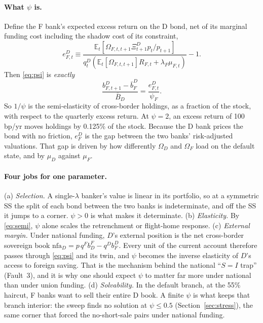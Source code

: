 \documentclass[11pt]{article}
\newcommand{\E}{\mathbb{E}}
\begin{document}
\paragraph{What $\psi$ is.} Define the F bank's expected excess return on the D bond, net of its
marginal funding cost including the shadow cost of its constraint,
\begin{equation}
e^D_{F,t}\equiv\frac{\E_t[\Omega_{F,t,t+1}\Xi^D_{t+1}p_t/p_{t+1}]}
{q^D_t(\E_t[\Omega_{F,t,t+1}]R_{F,t}+\lambda_F\mu_{F,t})}-1 .
\end{equation}
Then \eqref{eq:psi} is \emph{exactly}
\begin{equation}
\frac{b^D_{F,t+1}-\bar b^D_F}{\bar B_D}=\frac{e^D_{F,t}}{\psi_F}.
\label{eq:semi}
\end{equation}
So $1/\psi$ is the semi-elasticity of cross-border holdings, as a fraction of the stock, with
respect to the quarterly excess return. At $\psi=2$, an excess return of 100 bp/yr moves holdings
by 0.125\% of the stock. Because the D bank prices the bond with no friction, $e^D_F$ is the gap
between the two banks' risk-adjusted valuations. That gap is driven by how differently
$\Omega_D$ and $\Omega_F$ load on the default state, and by $\mu_D$ against $\mu_F$.

\paragraph{Four jobs for one parameter.} (a) \emph{Selection.} A single-$\lambda$ banker's
value is linear in its portfolio, so at a symmetric SS the split of each bond between the two
banks is indeterminate, and off the SS it jumps to a corner. $\psi>0$ is what makes it
determinate. (b) \emph{Elasticity.} By \eqref{eq:semi}, $\psi$ alone scales the retrenchment
or flight-home response. (c) \emph{External margin.} Under national funding, $D$'s external
position is the net cross-border sovereign book
$\mathrm{nfa}_D=p\,q^F b^F_D-q^D b^D_F$. Every unit of the current account therefore passes
through \eqref{eq:psi} and its twin, and $\psi$ becomes the inverse elasticity of $D$'s access to
foreign saving. That is the mechanism behind the national ``$S=I$ trap'' (Fault~3), and it is
why one should expect $\psi$ to matter far more under national than under union funding.
(d) \emph{Solvability.} In the default branch, at the 55\% haircut, F banks want to sell their
entire D book. A finite $\psi$ is what keeps that branch interior: the sweep finds no solution
at $\psi\le0.5$ (Section~\ref{sec:stress}), the same corner that forced the no-short-sale pairs
under national funding.
\end{document}
